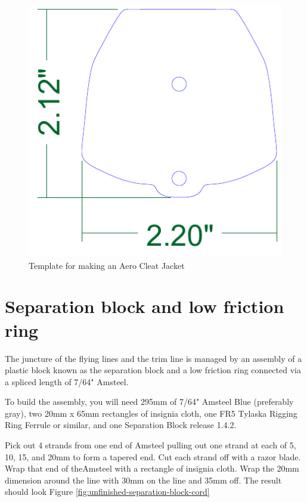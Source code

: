 \documentclass[]{book}
\begin{document}
\begin{figure}

{\centering \includegraphics[width=1\linewidth]{images/cleat_jacket_template} 

}

\caption{Template for making an Aero Cleat Jacket}\label{fig:cleat-jacket-template}
\end{figure}

\hypertarget{separation-block-and-low-friction-ring}{%
\section{Separation block and low friction ring}\label{separation-block-and-low-friction-ring}}

The juncture of the flying lines and the trim line is managed by an assembly of a plastic block known as the separation block and a low friction ring connected via a spliced length of 7/64" Amsteel.

To build the assembly, you will need 295mm of 7/64" Amsteel Blue (preferably gray), two 20mm x 65mm rectangles of insignia cloth, one FR5 Tylaska Rigging Ring Ferrule or similar, and one Separation Block release 1.4.2.

Pick out 4 strands from one end of Amsteel pulling out one strand at each of 5, 10, 15, and 20mm to form a tapered end. Cut each strand off with a razor blade. Wrap that end of theAmsteel with a rectangle of insignia cloth. Wrap the 20mm dimension around the line with 30mm on the line and 35mm off. The result should look Figure \ref{fig:unfinished-separation-block-cord}
\end{document}
